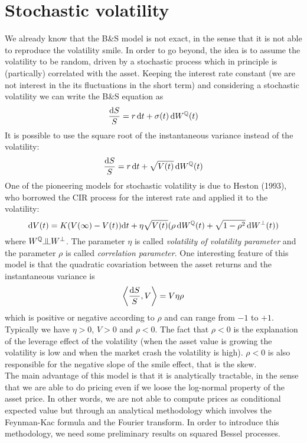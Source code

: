 \section{Stochastic volatility}
We already know that the B\&S model is not exact, in the sense that it is not able to reproduce the volatility smile. In order to go beyond, the idea is to assume the volatility to be random, driven by a stochastic process which in principle is (partically) correlated with the asset. Keeping the interest rate constant (we are not interest in the its fluctuations in the short term) and considering a stochastic volatility we can write the B\&S equation as
\begin{equation}
    \frac{\dd S}{S} = r\,\dd t + \sigma(t)\,\dd W^{\mathbb{Q}}(t)
\end{equation}
It is possible to use the square root of the instantaneous variance instead of the volatility:
\begin{equation}
    \frac{\dd S}{S} = r\,\dd t + \sqrt{V(t)}\,\dd W^{\mathbb{Q}}(t)
\end{equation}
One of the pioneering models for stochastic volatility is due to Heston (1993), who borrowed the CIR process for the interest rate and applied it to the volatility:
\begin{equation}
    \dd V(t) = K(V(\infty)-V(t))\dd t + \eta\sqrt{V(t)}(\rho\,\dd W^{\mathbb{Q}}(t) + \sqrt{1-\rho^2}\,\dd W^{\perp}(t))
\end{equation}%
where $W^{\Qmeas}\indep W^{\perp}$. The parameter $\eta$ is called \emph{volatility of volatility parameter} and the parameter $\rho$ is called \emph{correlation parameter}. One interesting feature of this model is that the quadratic covariation between the asset returns and the instantaneous variance is
\begin{equation*}
    \expval{\frac{\dd S}{S}, V} = V\eta\rho
\end{equation*}
which is positive or negative according to $\rho$ and can range from $-1$ to $+1$. Typically we have $\eta>0$, $V>0$ and $\rho<0$. The fact that $\rho<0$ is the explanation of the leverage effect of the volatility (when the asset value is growing the volatility is low and when the market crash the volatility is high). $\rho<0$ is also responsible for the negative slope of the smile effect, that is the skew. \\ %
The main advantage of this model is that it is analytically tractable, in the sense that we are able to do pricing even if we loose the log-normal property of the asset price. In other words, we are not able to compute prices as conditional expected value but through an analytical methodology which involves the Feynman-Kac formula and the Fourier transform. In order to introduce this methodology, we need some preliminary results on squared Bessel processes.

